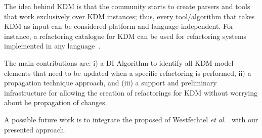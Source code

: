 
The
idea behind KDM is that the community starts to create
parsers and tools that work exclusively over KDM instances;
thus, every tool/algorithm that takes KDM as input can be
considered platform and language-independent. For instance,
a refactoring catalogue for KDM can be used for refactoring
systems implemented in any language~\cite{IRIDurelliCatalogo}.

The main contributions are: i) a DI Algorithm to identify all KDM model elements that need to be updated when a specific refactoring is performed, ii) a propagation technique approach, and (iii) a support and preliminary infrastructure for allowing the creation of refactorings for KDM without worrying about he propagation of changes.

 A possible future work is to integrate the proposed of Westfechtel \textit{et al}.~\cite{ICSOFT2014_Winetzhammer} with our presented approach.